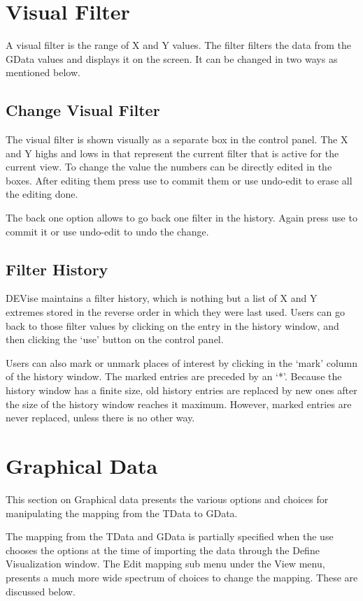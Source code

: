 \section{Visual Filter}

A visual filter is the range of X and Y values. The filter filters the
data from the GData values and displays it on the screen. It can be
changed in two ways as mentioned below.

\subsection{Change Visual Filter}

The visual filter is shown visually as a separate box in the control
panel. The X and Y highs and lows in that represent the current filter
that is active for the current view. To change the value the numbers
can be directly edited in the boxes. After editing them press use to
commit them or use undo-edit to erase all the editing done.

The back one option allows to go back one filter in the history. Again
press use to commit it or use undo-edit to undo the change.

\subsection{Filter History}

DEVise maintains a filter history, which is nothing but a list of X
and Y extremes stored in the reverse order in which they were last
used. Users can go back to those filter values by clicking on the
entry in the history window, and then clicking the `use' button on the
control panel.

Users can also mark or unmark places of interest by clicking in the
`mark' column of the history window. The marked entries are preceded
by an `*'.  Because the history window has a finite size, old history
entries are replaced by new ones after the size of the history window
reaches it maximum. However, marked entries are never replaced, unless
there is no other way.

\section{Graphical Data}

This section on Graphical data presents the various options and
choices for manipulating the mapping from the TData to GData.

The mapping from the TData and GData is partially specified when the
use chooses the options at the time of importing the data through the
Define Visualization window. The Edit mapping sub menu under the View
menu, presents a much more wide spectrum of choices to change the
mapping. These are discussed below.

